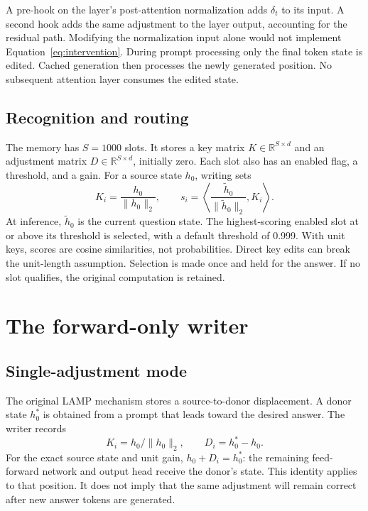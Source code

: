 \documentclass[manuscript,screen,nonacm]{acmart}
\begin{document}
A pre-hook on the layer's post-attention normalization adds $\delta_t$ to its input. A second hook adds the same adjustment to the layer output, accounting for the residual path. Modifying the normalization input alone would not implement Equation~\ref{eq:intervention}. During prompt processing only the final token state is edited. Cached generation then processes the newly generated position. No subsequent attention layer consumes the edited state.

\begin{center}
\end{center}

\subsection{Recognition and routing}
The memory has $S=1000$ slots. It stores a key matrix $K\in\mathbb{R}^{S\times d}$ and an adjustment matrix $D\in\mathbb{R}^{S\times d}$, initially zero. Each slot also has an enabled flag, a threshold, and a gain. For a source state $h_0$, writing sets
\begin{equation}
K_i=\frac{h_0}{\lVert h_0\rVert_2},
\qquad
s_i=\left\langle\frac{\widetilde h_0}{\lVert\widetilde h_0\rVert_2},K_i\right\rangle .
\end{equation}
At inference, $\widetilde h_0$ is the current question state. The highest-scoring enabled slot at or above its threshold is selected, with a default threshold of 0.999. With unit keys, scores are cosine similarities, not probabilities. Direct key edits can break the unit-length assumption. Selection is made once and held for the answer. If no slot qualifies, the original computation is retained.



\section{The forward-only writer}
\subsection{Single-adjustment mode}
The original LAMP mechanism stores a source-to-donor displacement. A donor state $h^\ast_0$ is obtained from a prompt that leads toward the desired answer. The writer records
\begin{equation}
K_i=h_0/\lVert h_0\rVert_2,\qquad D_i=h^\ast_0-h_0.
\end{equation}
For the exact source state and unit gain, $h_0+D_i=h^\ast_0$: the remaining feed-forward network and output head receive the donor's state. This identity applies to that position. It does not imply that the same adjustment will remain correct after new answer tokens are generated.
\end{document}
